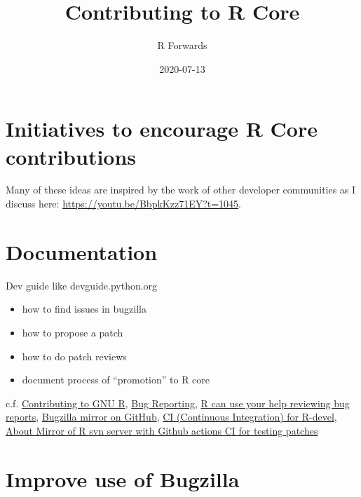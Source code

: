 \documentclass[]{book}
\title{Contributing to R Core}
\author{R Forwards}
\date{2020-07-13}
\providecommand{\tightlist}{%
  \setlength{\itemsep}{0pt}\setlength{\parskip}{0pt}}
\begin{document}
\maketitle

{
\setcounter{tocdepth}{1}
\tableofcontents
}
\hypertarget{section}{%
\chapter*{}\label{section}}

\hypertarget{initiatives-to-encourage-r-core-contributions}{%
\chapter{Initiatives to encourage R Core contributions}\label{initiatives-to-encourage-r-core-contributions}}

Many of these ideas are inspired by the work of other developer communities as I discuss here: \url{https://youtu.be/BbpkKzz71EY?t=1045}.

\hypertarget{documentation}{%
\chapter{Documentation}\label{documentation}}

Dev guide like devguide.python.org

\begin{itemize}
\tightlist
\item
  how to find issues in bugzilla
\item
  how to propose a patch
\item
  how to do patch reviews
\item
  document process of ``promotion'' to R core
\end{itemize}

c.f. \href{https://bookdown.org/lionel/contributing/}{Contributing to GNU R}, \href{https://www.r-project.org/bugs.html}{Bug Reporting}, \href{https://developer.r-project.org/Blog/public/2019/10/09/r-can-use-your-help-reviewing-bug-reports/index.html}{R can use your help reviewing bug reports}, \href{https://github.com/MichaelChirico/r-bugs}{Bugzilla mirror on GitHub}, \href{https://github.com/MichaelChirico/r-core-builder}{CI (Continuous Integration) for R-devel}, \href{https://github.com/jeroen/r-svn}{About
Mirror of R svn server with Github actions CI for testing patches}

\hypertarget{improve-use-of-bugzilla}{%
\chapter{Improve use of Bugzilla}\label{improve-use-of-bugzilla}}
\end{document}
